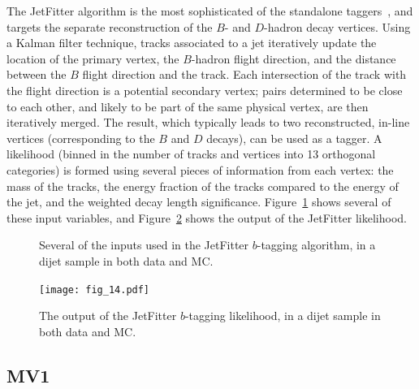 The JetFitter algorithm is the most sophisticated of the standalone taggers~\cite{ATLAS-B,JetFitter}, and targets the separate reconstruction of the $B$- and $D$-hadron decay vertices. Using a Kalman filter technique, tracks associated to a jet iteratively update the location of the primary vertex, the $B$-hadron flight direction, and the distance between the $B$ flight direction and the track. Each intersection of the track with the flight direction is a potential secondary vertex; pairs determined to be close to each other, and likely to be part of the same physical vertex, are then iteratively merged. The result, which typically leads to two reconstructed, in-line vertices (corresponding to the $B$ and $D$ decays), can be used as a tagger. A likelihood (binned in the number of tracks and vertices into 13 orthogonal categories) is formed using several pieces of information from each vertex: the mass of the tracks, the energy fraction of the tracks compared to the energy of the jet, and the weighted decay length significance. Figure~\ref{fig:jet-reconstruction:b-tagging:jetfitter} shows several of these input variables, and Figure~\ref{fig:jet-reconstruction:b-tagging:jetfitter_total} shows the output of the JetFitter likelihood.


\begin{figure}
\centering
{}
\label{fig:jet-reconstruction:b-tagging:jetfitter}
\caption{Several of the inputs used in the JetFitter $b$-tagging algorithm, in a dijet sample in both data and MC.}
\end{figure}




\begin{figure}
\centering
\texttt{[image: fig\_14.pdf]}
\label{fig:jet-reconstruction:b-tagging:jetfitter_total}
\caption{The output of the JetFitter $b$-tagging likelihood, in a dijet sample in both data and MC.}
\end{figure}


\subsection{MV1}


